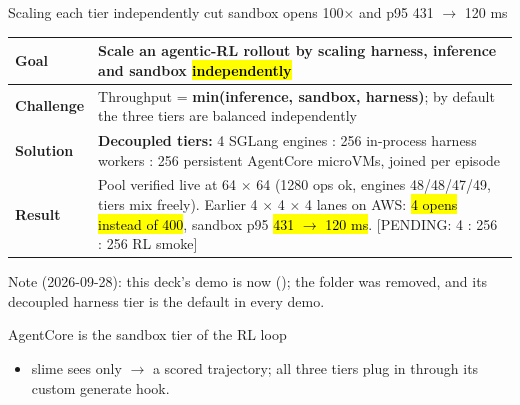 \begin{frame}{Scaling each tier independently cut sandbox opens 100$\times$ and p95 431 $\rightarrow$ 120 ms}
\footnotesize
\begin{tabularx}{\textwidth}{@{}p{}X@{}}
\toprule
\textbf{Goal} & Scale an agentic-RL rollout by scaling harness, inference and sandbox \hl{independently}\\
\midrule
\textbf{Challenge} & Throughput = \textbf{min(inference, sandbox, harness)}; by default the three tiers are balanced independently\\
\midrule
\textbf{Solution} & \textbf{Decoupled tiers:} 4 SGLang engines : 256 in-process harness workers : 256 persistent AgentCore microVMs, joined per episode\\
\midrule
\textbf{Result} & Pool verified live at 64 $\times$ 64 (1280 ops ok, engines 48/48/47/49, tiers mix freely). Earlier 4 $\times$ 4 $\times$ 4 lanes on AWS: \hl{4 opens instead of 400}, sandbox p95 \hl{431 $\rightarrow$ 120 ms}. [PENDING: 4 : 256 : 256 RL smoke]\\
\bottomrule
\end{tabularx}
\par\vspace{2mm}
{\scriptsize\color{inkmuted}Note (2026-09-28): this deck's demo is now 
(); the  folder was removed,
and its decoupled harness tier is the default in every demo.\par}
\vspace{2mm}
\end{frame}


\begin{frame}{AgentCore is the sandbox tier of the RL loop}
\centering
{}\par
\vspace{3mm}
\raggedright
\begin{itemize}\small
\item slime sees only  $\rightarrow$ a scored trajectory; all three tiers plug in through its custom generate hook.
\end{itemize}
\end{frame}

